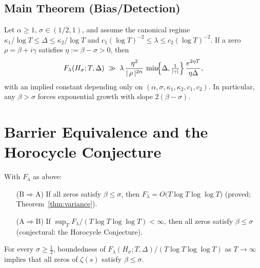 \subsection{Main Theorem (Bias/Detection)}\label{subsec:bias-theorem}

\begin{theorem}\label{thm:bias}
Let $\alpha\ge1$, $\sigma\in(1/2,1)$, and assume the canonical regime
$\kappa_1/\log T \le \Delta \le \kappa_2/\log T$ and
$c_1(\log T)^{-2}\le \lambda \le c_2(\log T)^{-2}$.  If a zero
$\rho=\beta+i\gamma$ satisfies $\eta:=\beta-\sigma>0$, then
\[
F_\lambda(H_\sigma;T,\Delta)
\;\gg\;
\lambda\,
\frac{\eta^{2}}{|\,\rho\,|^{2\alpha}}\,
\min\!\Bigl\{\Delta,\tfrac{1}{|\gamma|}\Bigr\}\,
\frac{e^{2\eta T}}{\eta\Delta},
\]
with an implied constant depending only on $(\alpha,\sigma,\kappa_1,\kappa_2,c_1,c_2)$.
In particular, any $\beta>\sigma$ forces exponential growth with slope $2(\beta-\sigma)$.
\end{theorem}

\section{Barrier Equivalence and the Horocycle Conjecture}\label{sec:barrier}

\begin{theorem}\label{thm:barrier}
With $F_\lambda$ as above:
\begin{enumerate}
\item[(B$\Rightarrow$A)] If all zeros satisfy $\beta\le\sigma$, then
$F_\lambda=O\!\bigl(T\log T\log\log T\bigr)$
\textup{(proved; Theorem~\ref{thm:variance}).}
\item[(A$\Rightarrow$B)] If $\sup_T F_\lambda/(T\log T\log\log T)<\infty$, then all zeros satisfy
$\beta\le\sigma$ \textup{(conjectural: the Horocycle Conjecture).}
\end{enumerate}
\end{theorem}

\begin{conjecture}\label{conj:horocycle}
For every $\sigma\ge\tfrac12$, boundedness of $F_\lambda(H_\sigma;T,\Delta)/(T\log T\log\log T)$
as $T\to\infty$ implies that all zeros of $\zeta(s)$ satisfy $\beta\le\sigma$.
\end{conjecture}


